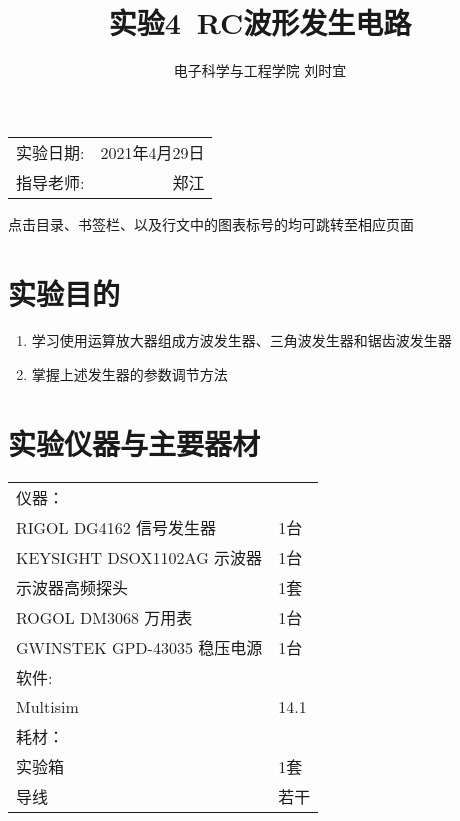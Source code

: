 \documentclass[UTF8]{ctexart}
\title{\textbf{实验4\ RC波形发生电路}} %
\author{电子科学与工程学院 刘时宜} %
\date{} %
\numberwithin{figure}{subsection}
\numberwithin{table}{subsection}
\numberwithin{equation}{subsection}
\begin{document}
\pagestyle{EE_AnalogExp_template}

\maketitle %

\begin{center}
    \begin{tabular}{l r}
    实验日期: & 2021年4月29日 \\ %
    指导老师: & 郑江 %
    \end{tabular}
    \par 点击目录、书签栏、以及行文中的图表标号的均可跳转至相应页面
    \end{center}
    

\tableofcontents

\section{实验目的}
\begin{enumerate}
    \item 学习使用运算放大器组成方波发生器、三角波发生器和锯齿波发生器
    \item 掌握上述发生器的参数调节方法
\end{enumerate}
\section{实验仪器与主要器材}
\begin{center}
    \begin{tabular}{ll}
        仪器： & \\
        RIGOL DG4162 信号发生器 & 1台\\
        KEYSIGHT DSOX1102AG 示波器 & 1台\\
        示波器高频探头 & 1套\\
        ROGOL DM3068 万用表 & 1台\\
        GWINSTEK GPD-43035 稳压电源 & 1台\\
        软件: & \\
        Multisim & 14.1 \\
        耗材： & \\
        实验箱 & 1套 \\
        导线 & 若干 \\
    \end{tabular}
\end{center}
\end{document}
